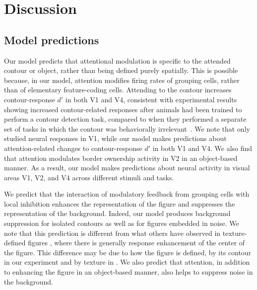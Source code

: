 \section{Discussion}
\label{sec:discussion}


\subsection{Model predictions}

Our model predicts that attentional modulation is specific to the
attended contour or object, 
rather than being defined purely
spatially. This is possible because, in our model, attention modifies firing
rates of grouping cells, rather than of elementary feature-coding
cells. Attending to the contour increases
contour-response $d'$ in both V1 and V4, consistent with experimental
results showing increased contour-related responses after animals had
been trained to perform a contour detection task, compared to when
they performed a separate set of tasks in which the contour was
behaviorally irrelevant~\citep{Li_etal08a}. We note that
\cite{Li_etal08a} only studied neural responses in V1, while our model
makes predictions about attention-related changes to contour-response
$d'$ in both V1 and V4.
We also find that attention modulates border ownership activity in V2 in an object-based manner. As a result, our model makes predictions about neural activity in visual areas
V1, V2, and V4 across different stimuli and tasks.
%

We predict that
the interaction of modulatory feedback from grouping cells with local
inhibition enhances the representation of the figure and suppresses
the representation of the background. 
Indeed, our model produces background suppression for
isolated contours as well as for figures embedded in noise.
We note that this prediction is different from what others have observed in
texture-defined figures \citep{Lamme95,Lee_etal98a}, where there is
generally response enhancement
of the center of the figure.
 This difference may be due to how the figure is defined,
by its contour in our experiment and by texture in
\cite{Lamme95,Lee_etal98a}. We also predict that attention, in
addition to enhancing the figure in an object-based manner, also helps
to suppress noise in the background. 


